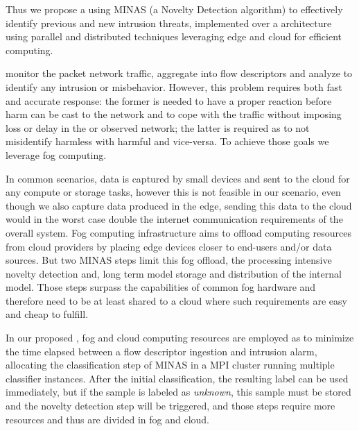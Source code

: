 
Thus we propose a \nids using MINAS \cite{Faria2016minas} (a Novelty Detection algorithm)
to effectively identify previous and new intrusion threats,
implemented over a architecture \cite{Cassales2019a} using parallel and distributed techniques leveraging
edge and cloud for efficient computing.

\nids 
monitor the packet network traffic, aggregate into flow descriptors and
analyze to identify any intrusion or misbehavior.
However, this problem requires both fast and accurate response:
the former is needed to have a proper reaction before harm can be cast
to the network and to cope with the traffic without imposing loss or delay
in the \nids or observed network;
the latter is required as to not misidentify harmless with harmful and vice-versa.
To achieve those goals we leverage fog computing.


In common \iot scenarios, data is captured by small devices and sent to the
cloud for any compute or storage tasks, however this is not feasible in our
\nids scenario, even though we also capture data produced in the edge,
sending this data to the cloud would in the worst case double the
internet communication requirements of the overall system.
Fog computing infrastructure aims to offload
computing resources from cloud providers by placing edge
devices closer to end-users and/or data sources.
But two MINAS steps limit this fog offload,
the processing intensive novelty detection and,
long term model storage and distribution of the internal model.
Those steps surpass the capabilities of common fog hardware and
therefore need to be at least shared to a cloud where such
requirements are easy and cheap to fulfill.

In our proposed \nids, fog and cloud computing resources are
employed as to minimize the time elapsed between a flow descriptor
ingestion and intrusion alarm, allocating the 
classification step of MINAS in a MPI cluster running multiple
classifier instances.
After the initial classification, the resulting label can be used immediately,
but if the sample is labeled as \emph{unknown}, this sample must be stored
and the novelty detection step will be triggered, and those steps require more resources
and thus are divided in fog and cloud.

